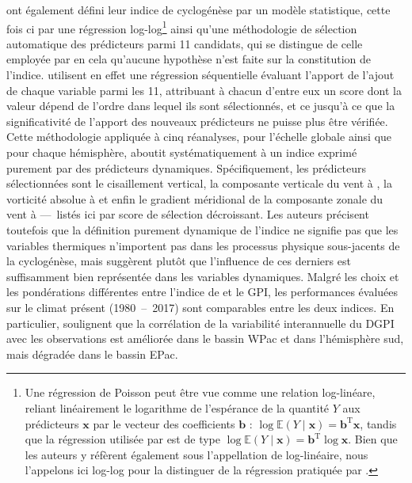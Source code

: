 \documentclass[../main.tex]{subfiles}
\begin{document}
\textcite{wang_dynamic_2020} ont également défini leur indice de cyclogénèse par un modèle statistique, cette fois ci par une régression log-log\footnote{Une
régression de Poisson peut être vue comme une relation log-linéare, reliant linéairement le logarithme de l'espérance de la quantité $Y$ aux prédicteurs
$\mathbf{x}$ par le vecteur des coefficients $\mathbf{b}$ : $\log \mathbb{E} (Y \mid \mathbf{x}) = \mathbf{b}^{\mathrm{T}} \mathbf{x}$, tandis que la
régression utilisée par \textcite{wang_dynamic_2020} est de type $\log \mathbb{E}(Y \mid \mathbf{x}) = \mathbf{b}^{\mathrm{T}} \log \mathbf{x}$. Bien que
les auteurs y réfèrent également sous l'appellation de log-linéaire, nous l'appelons ici log-log pour la distinguer de la régression pratiquée par
\citeauthor{tippett_poisson_2011}.} ainsi qu'une méthodologie de sélection automatique des prédicteurs parmi \num{11} candidats, qui se distingue de celle
employée par \textcite{tippett_poisson_2011} en cela qu'aucune hypothèse n'est faite sur la constitution de l'indice. \textcite{wang_dynamic_2020} utilisent
en effet une régression séquentielle évaluant l'apport de l'ajout de chaque variable parmi les \num{11}, attribuant à chacun d'entre eux un score dont la valeur
dépend de l'ordre dans lequel ils sont sélectionnés, et ce jusqu'à ce que la significativité de l'apport des nouveaux prédicteurs ne puisse plus être vérifiée.
Cette méthodologie appliquée à cinq réanalyses, pour l'échelle globale ainsi que pour chaque hémisphère, aboutit systématiquement à un indice exprimé purement
par des prédicteurs dynamiques. Spécifiquement, les prédicteurs sélectionnées sont le cisaillement vertical, la composante verticale du vent à , la
vorticité absolue à  et enfin le gradient méridional de la composante zonale du vent à  ---~listés ici par score de sélection décroissant.
Les auteurs précisent toutefois que la définition purement dynamique de l'indice ne signifie pas que les variables thermiques
n'importent pas dans les processus physique sous-jacents de la cyclogénèse, mais suggèrent plutôt que l'influence de ces derniers est suffisamment bien
représentée dans les variables dynamiques. Malgré les choix et les pondérations différentes entre l'indice de \textcite{wang_dynamic_2020} et le GPI, les
performances évaluées sur le climat présent (\num{1980}~--~\num{2017}) sont comparables entre les deux indices. En particulier, \textcite{wang_dynamic_2020}
soulignent que la corrélation de la variabilité interannuelle du DGPI avec les observations est améliorée dans le bassin WPac et dans l'hémisphère sud, mais
dégradée dans le bassin EPac.
\end{document}

